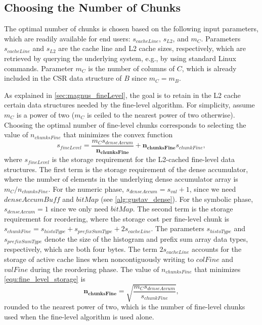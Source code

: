 \subsection{Choosing the Number of Chunks}\label{sec:magnus_opt_params}

The optimal number of chunks is chosen based on the following input parameters, which are readily available for end users: $s_{cacheLine}$, $s_{L2}$, and $m_C$.
Parameters $s_{cacheLine}$ and $s_{L2}$ are the cache line and L2 cache sizes, respectively, which are retrieved by querying the underlying system, e.g., by using standard Linux commands.
Parameter $m_C$ is the number of columns of $C$, which is already included in the CSR data structure of $B$ since $m_C = m_B$.

As explained in \autoref{sec:magnus_fineLevel}, the goal is to retain in the L2 cache certain data structures needed by the fine-level algorithm.
For simplicity, assume $m_C$ is a power of two ($m_C$ is ceiled to the nearest power of two otherwise).
Choosing the optimal number of fine-level chunks corresponds to selecting the value of $n_{chunksFine}$ that minimizes the convex function
\begin{equation}
s_{fineLevel} = \frac{m_C s_{denseAccum}}{\boldsymbol{n_{chunksFine}}} + \boldsymbol{n_{chunksFine}} s_{chunkFine},
\label{equ:fine_level_storage}
\end{equation}
where $s_{fineLevel}$ is the storage requirement for the L2-cached fine-level data structures.
The first term is the storage requirement of the dense accumulator, where the number of elements in the underlying dense accumulator array is $m_C/n_{chunksFine}$. 
For the numeric phase, $s_{denseAccum} = s_{val}+1$, since we need $denseAccumBuff$ and $bitMap$ (see \autoref{alg:gustav_dense}).
For the symbolic phase, $s_{denseAccum} = 1$ since we only need $bitMap$.
The second term is the storage requirement for reordering,
where the storage cost per fine-level chunk is $s_{chunkFine} = s_{histoType}+s_{prefixSumType}+2 s_{cacheLine}$.
The parameters $s_{histoType}$ and $s_{prefixSumType}$ denote the size of the histogram and prefix sum array data types, respectively, which are both four bytes.
The term $2 s_{cacheLine}$ accounts for the storage of active cache lines when noncontiguously writing to $colFine$ and $valFine$ during the reordering phase.
The value of $n_{chunksFine}$ that minimizes \autoref{equ:fine_level_storage} is
\begin{equation}
\boldsymbol{n_{chunksFine}}=\sqrt{\frac{m_C s_{denseAccum}}{s_{chunkFine}}},
\label{equ:fine_level_nchunks_optimal}
\end{equation}
rounded to the nearest power of two, which
is the number of fine-level chunks used 
when the fine-level algorithm is used alone.

